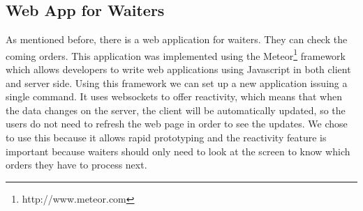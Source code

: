 \subsection{Web App for Waiters}
\label{sub:web_app_for_waiters}
As mentioned before, there is a web application for waiters. They can
check the coming orders.
This application was implemented using the
Meteor\footnote{http://www.meteor.com}\cite{meteor} framework which
allows developers
to write web applications using Javascript in both client and server side.
Using this framework we can set up a new application issuing a single command.
It uses websockets\cite{websockets} to offer reactivity, which means that
when the data changes on the server,
the client will be automatically updated, so the users do not need to
refresh the web page in order to see the updates. We chose to use this
because it allows rapid prototyping and the reactivity feature is important
because waiters should only need to look at the screen to know which
orders they have to process next.
